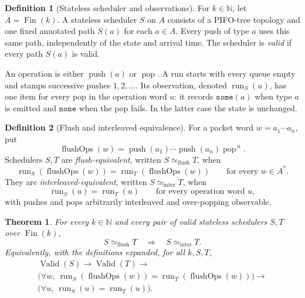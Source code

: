 \documentclass[11pt]{article}
\newtheorem{theorem}{Theorem}
\theoremstyle{definition}
\newtheorem{definition}{Definition}
\newcommand{\Fin}{\operatorname{Fin}}
\newcommand{\run}{\operatorname{run}}
\newcommand{\flushOps}{\operatorname{flushOps}}
\newcommand{\Some}[1]{\texttt{some}(#1)}
\newcommand{\None}{\texttt{none}}
\newcommand{\intereq}{\simeq_{\mathrm{inter}}}
\newcommand{\flusheq}{\simeq_{\mathrm{flush}}}
\begin{document}
\begin{definition}[Stateless scheduler and observations]
For \(k\in\mathbb N\), let \(A=\Fin(k)\).  A stateless scheduler \(S\) on
\(A\) consists of a PIFO-tree topology and one fixed annotated path
\(S(a)\) for each \(a\in A\).  Every push of type \(a\) uses this same path,
independently of the state and arrival time.  The scheduler is
\emph{valid} if every path \(S(a)\) is valid.

An operation is either \(\operatorname{push}(a)\) or
\(\operatorname{pop}\).  A run starts with every queue empty and stamps
successive pushes \(1,2,\ldots\).  Its observation, denoted
\(\run_S(u)\), has one item for every pop in the operation word \(u\):
it records \(\Some{a}\) when type \(a\) is emitted and \(\None\) when the
pop fails.  In the latter case the state is unchanged.
\end{definition}

\begin{definition}[Flush and interleaved equivalence]
For a packet word \(w=a_1\cdots a_n\), put
\[
  \flushOps(w)
  =
  \operatorname{push}(a_1)\cdots\operatorname{push}(a_n)
  \operatorname{pop}^{\,n}.
\]
Schedulers \(S,T\) are \emph{flush-equivalent}, written
\(S\flusheq T\), when
\[
  \run_S(\flushOps(w))=\run_T(\flushOps(w))
  \qquad\text{for every }w\in A^*.
\]
They are \emph{interleaved-equivalent}, written \(S\intereq T\), when
\[
  \run_S(u)=\run_T(u)
  \qquad\text{for every operation word }u,
\]
with pushes and pops arbitrarily interleaved and over-popping observable.
\end{definition}

\begin{theorem}
For every \(k\in\mathbb N\) and every pair of valid stateless schedulers
\(S,T\) over \(\Fin(k)\),
\[
  S\flusheq T \quad\Longrightarrow\quad S\intereq T.
\]
Equivalently, with the definitions expanded, for all \(k,S,T\),
\[
  \begin{gathered}
    \operatorname{Valid}(S)\longrightarrow
    \operatorname{Valid}(T)\longrightarrow\\
    \bigl(\forall w,\ 
      \run_S(\flushOps(w))=\run_T(\flushOps(w))\bigr)
    \longrightarrow\\
    \bigl(\forall u,\ \run_S(u)=\run_T(u)\bigr).
  \end{gathered}
\]
\end{theorem}
\end{document}
